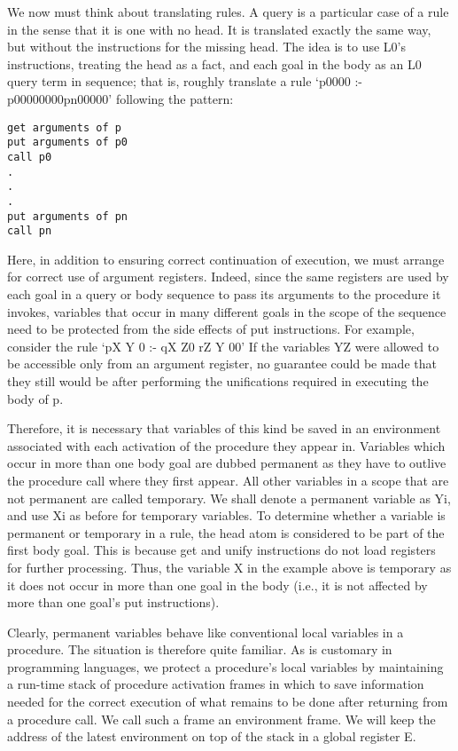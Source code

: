 
We now must think about translating rules. A query is a particular case of a rule
in the sense that it is one with no head. It is translated exactly the same way,
but without the instructions for the missing head. The idea is to use L0’s instructions,
treating the head as a fact, and each goal in the body as an L0 query term
in sequence; that is, roughly translate a rule ‘p0000
:- p00000000pn00000’
following the pattern:
\begin{verbatim}
get arguments of p
put arguments of p0
call p0
.
.
.
put arguments of pn
call pn
\end{verbatim}

Here, in addition to ensuring correct continuation of execution, we must arrange
for correct use of argument registers. Indeed, since the same registers are used by
each goal in a query or body sequence to pass its arguments to the procedure it
invokes, variables that occur in many different goals in the scope of the sequence
need to be protected from the side effects of put instructions. For example, consider
the rule ‘pX
Y 0 :- qX
Z0
rZ
Y 00’ If the variables YZ
were allowed
to be accessible only from an argument register, no guarantee could be made that
they still would be after performing the unifications required in executing the body
of p.

Therefore, it is necessary that variables of this kind be saved in an environment
associated with each activation of the procedure they appear in. Variables which
occur in more than one body goal are dubbed permanent as they have to outlive
the procedure call where they first appear. All other variables in a scope that are
not permanent are called temporary. We shall denote a permanent variable as Yi,
and use Xi as before for temporary variables. To determine whether a variable is
permanent or temporary in a rule, the head atom is considered to be part of the
first body goal. This is because get and unify instructions do not load registers
for further processing. Thus, the variable X in the example above is temporary as
it does not occur in more than one goal in the body (i.e., it is not affected by more
than one goal’s put instructions).

Clearly, permanent variables behave like conventional local variables in a procedure.
The situation is therefore quite familiar. As is customary in programming
languages, we protect a procedure’s local variables by maintaining a run-time
stack of procedure activation frames in which to save information needed for the
correct execution of what remains to be done after returning from a procedure call.
We call such a frame an environment frame. We will keep the address of the latest
environment on top of the stack in a global register E.


